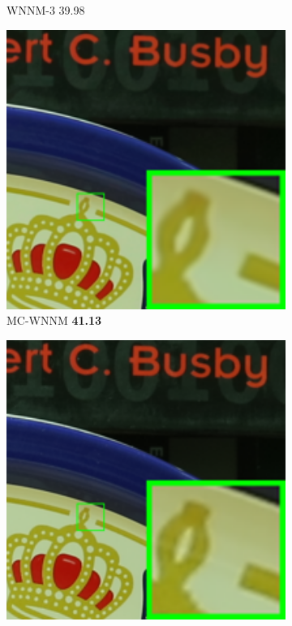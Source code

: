 \begin{figure}
\begin{subfigure}[t]{0.19\textwidth}
		\caption{WNNM-3 39.98}
    \end{subfigure}
    \hfill
    \begin{subfigure}[t]{0.19\textwidth}
        \centering
        \includegraphics[width=1\textwidth]{images/mcwnnm/cc/resize_br_CWNNM_ADMM_NL_CC15_5dmark3_iso3200_1.png}
		\caption{MC-WNNM \textbf{41.13}}
    \end{subfigure}
    \hfill
    \begin{subfigure}[t]{0.19\textwidth}
        \centering
        \includegraphics[width=1\textwidth]{images/mcwnnm/cc/resize_br_5dmark3_iso3200_1.png}

\end{subfigure}
\end{figure}
